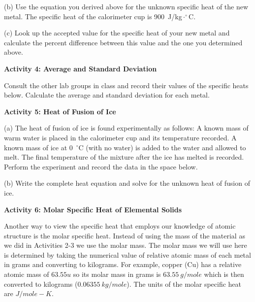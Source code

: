 (b) Use the equation you derived above for the unknown specific
heat of the new metal. 
The specific heat of the calorimeter cup is 900~J/kg$\cdot^{\circ}$C.

\answerspace{2.5cm}

(c) Look up the accepted value for the specific heat of your new metal and
calculate the percent difference between this value and the one you
determined above. 
\answerspace{25mm}

\pagebreak[3]
\textbf{Activity 4: Average and Standard Deviation}

Consult the other lab groups in class and record their values of the specific
heats below.
Calculate the average and standard deviation for each metal.
\answerspace{1.2in}


\textbf{Activity 5: Heat of Fusion of Ice}

(a) The heat of fusion of ice is found experimentally as follows:
A known mass of warm water is placed in the calorimeter cup and its
temperature recorded. A known mass of ice at 0~$^{\circ}$C (with
no water) is added to the water and allowed to melt. The final temperature
of the mixture after the ice has melted is recorded. Perform the experiment
and record the data in the space below.

\answerspace{20mm}

(b) Write the complete heat equation and solve for the unknown heat
of fusion of ice.
\answerspace{25mm}

\textbf{Activity 6: Molar Specific Heat of Elemental Solids}

Another way to view the specific heat that employs our knowledge of atomic structure
is the molar specific heat. 
Instead of using the mass of the material as we did in Activities 2-3 we use the molar mass.
The molar mass we will use here is determined by taking the numerical value of relative atomic mass 
of each metal in grams and converting to kilograms. 
For example, copper (Cu) has a relative atomic mass of $63.55 u$ so its molar mass in grams
is $63.55~g/mole$ which is then converted to kilograms ($0.06355~kg/mole$).
The units of the molar specific heat are $J/mole-K$.

